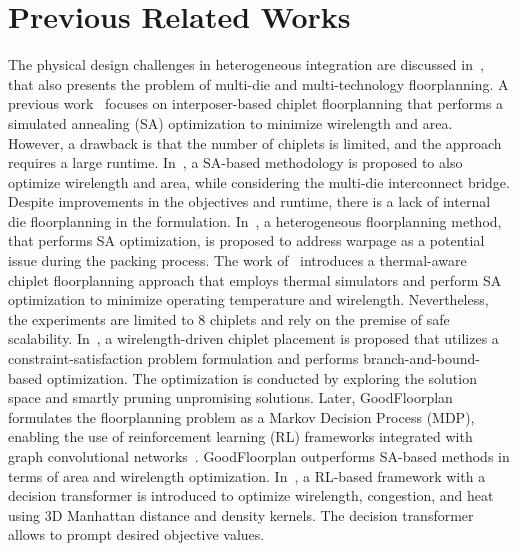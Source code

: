 \section{Previous Related Works}
\label{sec:previousWorks}
The physical design challenges in heterogeneous integration are discussed in~\cite{chang2024multidieChallenges}, that also presents the problem of multi-die and multi-technology floorplanning. 
A previous work~\cite{ho2013btreeSA} focuses on interposer-based chiplet floorplanning that performs a simulated annealing (SA) optimization to minimize wirelength and area. However, a drawback is that the number of chiplets is limited, and the approach requires a large runtime.
In~\cite{lee2023multiDieFloorplan}, a SA-based methodology is proposed to also optimize wirelength and area, while considering the multi-die interconnect bridge. Despite improvements in the objectives and runtime, there is a lack of internal die floorplanning in the formulation.
In~\cite{hsu2022warpageFloorplan}, a heterogeneous floorplanning method, that performs SA optimization, is proposed to address warpage as a potential issue during the packing process.
The work of~\cite{ma2021thermalFloorplan} introduces a thermal-aware chiplet floorplanning approach that employs thermal simulators and perform SA optimization to minimize operating temperature and wirelength. Nevertheless, the experiments are limited to 8 chiplets and rely on the premise of safe scalability.
In~\cite{osmolovskyi2018diePlacement}, a wirelength-driven chiplet placement is proposed that utilizes a constraint-satisfaction problem formulation and performs branch-and-bound-based optimization. The optimization is conducted by exploring the solution space and smartly pruning unpromising solutions.
Later, GoodFloorplan formulates the floorplanning problem as a Markov Decision Process (MDP), enabling the use of reinforcement learning (RL) frameworks integrated with graph convolutional networks~\cite{xu2022goodfloorplan}. GoodFloorplan outperforms SA-based methods in terms of area and wirelength optimization. %
In~\cite{amin2024RLFloorplan3D}, a RL-based framework with a decision transformer is introduced to optimize wirelength, congestion, and heat using 3D Manhattan distance and density kernels. The decision transformer allows to prompt desired objective values.
